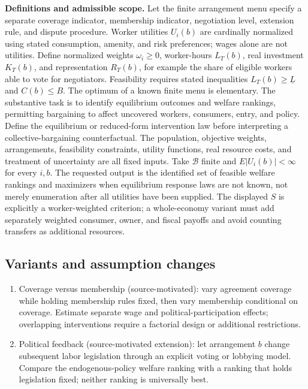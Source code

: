 \documentclass[11pt,a4paper]{article}
\begin{document}
\textbf{Definitions and admissible scope.} Let the finite arrangement menu specify a separate coverage indicator, membership indicator, negotiation level, extension rule, and dispute procedure. Worker utilities \(U_i(b)\) are cardinally normalized using stated consumption, amenity, and risk preferences; wages alone are not utilities. Define normalized weights \(\omega_i\ge0\), worker-hours \(L_T(b)\), real investment \(K_T(b)\), and representation \(R_T(b)\), for example the share of eligible workers able to vote for negotiators. Feasibility requires stated inequalities \(L_T(b)\ge\underline L\) and \(C(b)\le B\). The optimum of a known finite menu is elementary. The substantive task is to identify equilibrium outcomes and welfare rankings, permitting bargaining to affect uncovered workers, consumers, entry, and policy. Define the equilibrium or reduced-form intervention law before interpreting a collective-bargaining counterfactual. The population, objective weights, arrangements, feasibility constraints, utility functions, real resource costs, and treatment of uncertainty are all fixed inputs. Take \(\mathcal B\) finite and \(E|U_i(b)|<\infty\) for every \(i,b\). The requested output is the identified set of feasible welfare rankings and maximizers when equilibrium response laws are not known, not merely enumeration after all utilities have been supplied. The displayed \(S\) is explicitly a worker-weighted criterion; a whole-economy variant must add separately weighted consumer, owner, and fiscal payoffs and avoid counting transfers as additional resources.
\subsection*{Variants and assumption changes}
\begin{enumerate}
\item Coverage versus membership (source-motivated): vary agreement coverage while holding membership rules fixed, then vary membership conditional on coverage. Estimate separate wage and political-participation effects; overlapping interventions require a factorial design or additional restrictions.
\item Political feedback (source-motivated extension): let arrangement \(b\) change subsequent labor legislation through an explicit voting or lobbying model. Compare the endogenous-policy welfare ranking with a ranking that holds legislation fixed; neither ranking is universally best.
\end{enumerate}
\end{document}
